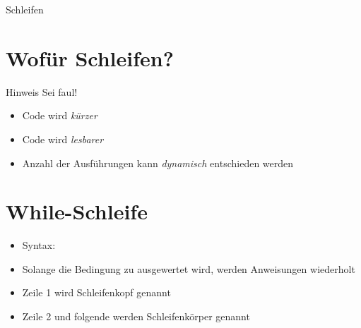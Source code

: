 



\begin{titleframe}
\begin{center}
	\vspace{2cm}
	{\huge Schleifen}
\end{center}
\end{titleframe}

\tocslide

\section{Wofür Schleifen?}
\begin{frame}
	\slidehead

\end{frame}

\begin{frame}
	\slidehead

	\pause
	\begin{block}{Hinweis}
		Sei faul!
	\end{block}
\end{frame}

\begin{frame}
	\slidehead

	\begin{itemize}
		\item Code wird \textit{kürzer}
		\item Code wird \textit{lesbarer}
		\item Anzahl der Ausführungen kann \textit{dynamisch} entschieden werden
	\end{itemize}
\end{frame}

\section{While-Schleife}
\begin{frame}
	\slidehead

	\begin{itemize}
		 \item Syntax:
		 \item Solange die Bedingung zu  ausgewertet wird, werden Anweisungen wiederholt
		 \item Zeile 1 wird Schleifenkopf genannt
		 \item Zeile 2 und folgende werden Schleifenkörper genannt
	\end{itemize}
\end{frame}

